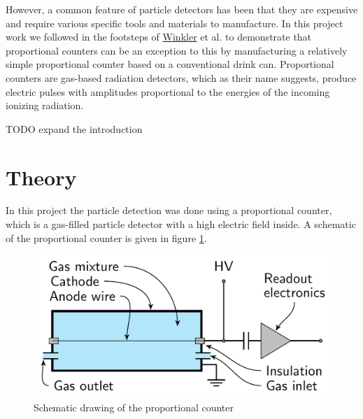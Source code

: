 \documentclass[a4paper]{article}
\begin{document}
However, a common feature of particle detectors has been that they are expensive and require various specific tools and materials to manufacture.
In this project work we followed in the footsteps of
\href{https://www.helsinki.fi/en/people/people-finder/alexander-winkler-9110087}{Winkler}
et al. \cite{winkler_gaseous_2015} to demonstrate that proportional counters can be an exception to this by manufacturing a relatively simple proportional counter based on a conventional drink can.
Proportional counters are gas-based radiation detectors, which as their name suggests, produce electric pulses with amplitudes proportional to the energies of the incoming ionizing radiation.

TODO expand the introduction


\section{Theory}
\label{theory}


In this project the particle detection was done using a proportional counter, which is a gas-filled particle detector with a high electric field inside.
\cite{instructions}
A schematic of the proportional counter is given in figure \ref{fig:theory_schematic}.

\begin{figure}[ht!]
\centering
\includegraphics[width=\textwidth]{fig/article/schematic.png}
\caption{Schematic drawing of the proportional counter \cite{winkler_gaseous_2015}}
\label{fig:theory_schematic}
\end{figure}
\end{document}
